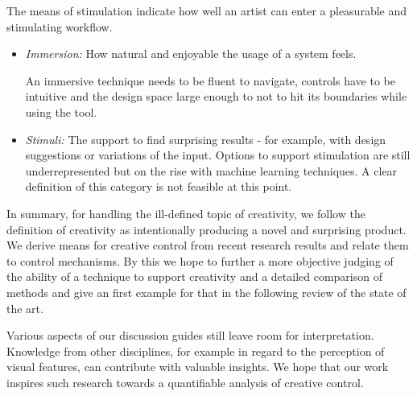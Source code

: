 The means of stimulation indicate how well an artist can enter a pleasurable and stimulating workflow.
\begin{itemize}
    \item \textit{Immersion:} How natural and enjoyable the usage of a system feels.

    An immersive technique needs to be fluent to navigate, controls have to be intuitive and the design space large enough to not to hit its boundaries while using the tool. 
    

    \item \textit{Stimuli:} The support to find surprising results - for example, with design suggestions or variations of the input. Options to support stimulation are still underrepresented but on the rise with machine learning techniques. A clear definition of this category is not feasible at this point.

\end{itemize}


In summary, for handling the ill-defined topic of creativity, we follow the definition of creativity as intentionally producing a novel and surprising product. We derive means for creative control from recent research results and relate them to control mechanisms. By this we hope to further a more objective judging of the ability of a technique to support creativity and a detailed comparison of methods and give an first example for that in the following review of the state of the art.

Various aspects of our discussion guides still leave room for interpretation. Knowledge from other disciplines, for example in regard to the perception of visual features, can contribute with valuable insights. We hope that our work inspires such research towards a quantifiable analysis of creative control.

